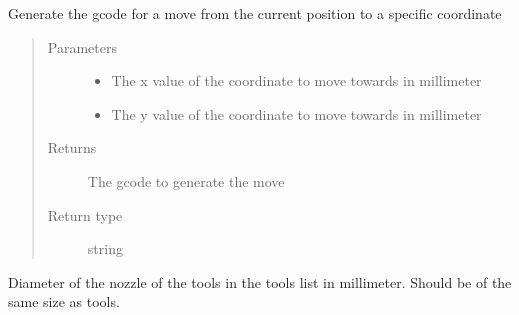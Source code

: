 \documentclass[letterpaper,10pt,english]{sphinxmanual}
\begin{document}
\begin{fulllineitems}

\begin{fulllineitems}
\label{\detokenize{index:generator.generator.move_to}}
\sphinxAtStartPar
Generate the gcode for a move from the current position to a specific coordinate
\begin{quote}\begin{description}
\item[{Parameters}] \leavevmode\begin{itemize}
\item {} 
\sphinxAtStartPar
{} \textendash{} The x value of the coordinate to move towards in millimeter

\item {} 
\sphinxAtStartPar
{} \textendash{} The y value of the coordinate to move towards in millimeter

\end{itemize}

\item[{Returns}] \leavevmode
\sphinxAtStartPar
The gcode to generate the move

\item[{Return type}] \leavevmode
\sphinxAtStartPar
string

\end{description}\end{quote}

\end{fulllineitems}


\begin{fulllineitems}
\label{\detokenize{index:generator.generator.nozzle_diameters}}
\sphinxAtStartPar
Diameter of the nozzle of the tools in the tools list in millimeter. Should be of the same size as tools.

\end{fulllineitems}



\end{fulllineitems}
\end{document}
